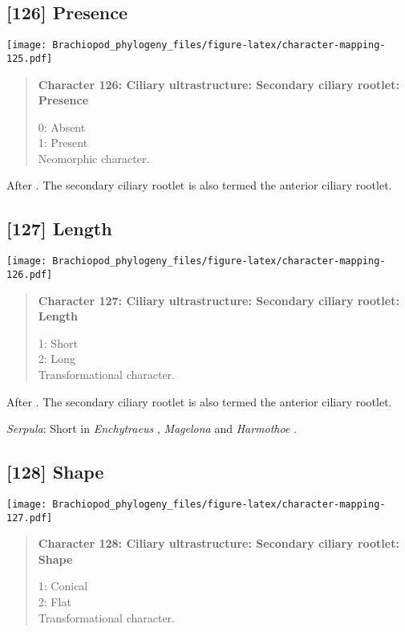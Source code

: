 \documentclass[openany]{book}
\theoremstyle{definition}
\theoremstyle{definition}
\theoremstyle{definition}
\theoremstyle{remark}
\begin{document}
\subsection*{{[}126{]} Presence}\label{presence-1}

\texttt{[image: Brachiopod\_phylogeny\_files/figure-latex/character-mapping-125.pdf]}

\begin{quote}
\textbf{Character 126: Ciliary ultrastructure: Secondary ciliary
rootlet: Presence}

0: Absent\\
1: Present\\
Neomorphic character.
\end{quote}

After \citet{Lundin2009}. The secondary ciliary rootlet is also termed
the anterior ciliary rootlet.

\subsection*{{[}127{]} Length}\label{length-1}

\texttt{[image: Brachiopod\_phylogeny\_files/figure-latex/character-mapping-126.pdf]}

\begin{quote}
\textbf{Character 127: Ciliary ultrastructure: Secondary ciliary
rootlet: Length}

1: Short\\
2: Long\\
Transformational character.
\end{quote}

After \citet{Lundin2009}. The secondary ciliary rootlet is also termed
the anterior ciliary rootlet.

\hypertarget{Serpula-coding-127}{}
\emph{Serpula}: Short in \emph{Enchytraeus} \citep{Reger1967},
\emph{Magelona} \citep{Bartolomaeus1995} and \emph{Harmothoe}
\citep{Holborow1969}.

\subsection*{{[}128{]} Shape}\label{shape-1}

\texttt{[image: Brachiopod\_phylogeny\_files/figure-latex/character-mapping-127.pdf]}

\begin{quote}
\textbf{Character 128: Ciliary ultrastructure: Secondary ciliary
rootlet: Shape}

1: Conical\\
2: Flat\\
Transformational character.
\end{quote}
\end{document}
